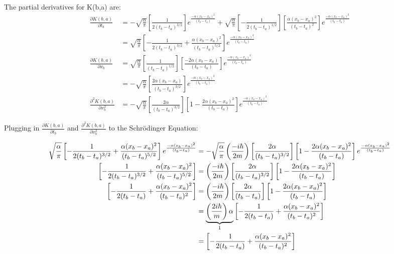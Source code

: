 \documentclass{article}
\begin{document}
The partial derivatives for K(b,a) are:
\begin{align*}
	\frac{\partial K(b,a)}{\partial t_b} 
	&= -\sqrt{\frac{\alpha}{\pi}} \left[\frac{1}{2(t_b - t_a)^{3/2}} \right] e^{\frac{-\alpha (x_b - x_a)^2}{(t_b - t_a)}} 
	+ \sqrt{\frac{\alpha}{\pi}} \left[-\frac{1}{2(t_b - t_a)^{1/2}} \right] \left[\frac{\alpha (x_b - x_a)^2}{(t_b - t_a)^2} \right] e^{\frac{-\alpha (x_b - x_a)^2}{(t_b - t_a)}} \\
	&= \sqrt{\frac{\alpha}{\pi}} \left[-\frac{1}{2(t_b - t_a)^{3/2}} + \frac{\alpha (x_b - x_a)^2}{(t_b - t_a)^{5/2}} \right] e^{\frac{-\alpha (x_b - x_a)^2}{(t_b - t_a)}} \\
	\frac{\partial K(b,a)}{\partial x_b}
	&= \sqrt{\frac{\alpha}{\pi}} \left[\frac{1}{(t_b - t_a)^{1/2}} \right] \left[\frac{-2\alpha (x_b - x_a)}{(t_b - t_a)} \right] e^{\frac{-\alpha (x_b - x_a)^2}{(t_b - t_a)}} \\
	&= -\sqrt{\frac{\alpha}{\pi}} \left[\frac{2\alpha (x_b - x_a)}{(t_b - t_a)^{3/2}} \right] e^{\frac{-\alpha (x_b - x_a)^2}{(t_b - t_a)}} \\
	\frac{\partial^2 K(b,a)}{\partial x_b^2}
	&= -\sqrt{\frac{\alpha}{\pi}} \left[\frac{2\alpha}{(t_b - t_a)^{3/2}} \right] \left[1 - \frac{2\alpha (x_b - x_a)^2}{(t_b - t_a)} \right] e^{\frac{-\alpha (x_b - x_a)^2}{(t_b - t_a)}}
\end{align*}

Plugging in $\frac{\partial K(b,a)}{\partial t_b}$ and $\frac{\partial^2 K(b,a)}{\partial x_b^2}$ to the Schr\"odinger Equation:

\begin{align*}
	\sqrt{\frac{\alpha}{\pi}} \left[-\frac{1}{2(t_b - t_a)^{3/2}} + \frac{\alpha (x_b - x_a)^2}{(t_b - t_a)^{5/2}} \right] e^{\frac{-\alpha (x_b - x_a)^2}{(t_b - t_a)}}
	&= -\sqrt{\frac{\alpha}{\pi}} \left(\frac{-i\hbar}{2m} \right) \left[\frac{2\alpha}{(t_b - t_a)^{3/2}} \right] \left[1 - \frac{2\alpha (x_b - x_a)^2}{(t_b - t_a)} \right] e^{\frac{-\alpha (x_b - x_a)^2}{(t_b - t_a)}} \\
	\left[-\frac{1}{2(t_b - t_a)^{3/2}} + \frac{\alpha (x_b - x_a)^2}{(t_b - t_a)^{5/2}} \right]
	&= \left(\frac{-i\hbar}{2m} \right) \left[\frac{2\alpha}{(t_b - t_a)^{3/2}} \right] \left[1 - \frac{2\alpha (x_b - x_a)^2}{(t_b - t_a)} \right] \\
	\left[-\frac{1}{2(t_b - t_a)} + \frac{\alpha (x_b - x_a)^2}{(t_b - t_a)^{2}} \right]
	&= \left(\frac{-i\hbar}{2m} \right) \left[\frac{2\alpha}{(t_b - t_a)} \right] \left[1 - \frac{2\alpha (x_b - x_a)^2}{(t_b - t_a)} \right] \\
	&= \underbrace{\left(\frac{2i\hbar}{m} \right) \alpha}_{\text1} \left[-\frac{1}{2(t_b - t_a)} + \frac{\alpha (x_b - x_a)^2}{(t_b - t_a)^2} \right] \\
	&= \left[-\frac{1}{2(t_b - t_a)} + \frac{\alpha (x_b - x_a)^2}{(t_b - t_a)^2} \right]
\end{align*}
\end{document}
